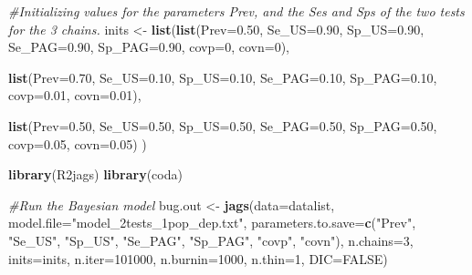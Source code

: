 \documentclass[
]{book}
\newenvironment{Shaded}{\begin{snugshade}}{\end{snugshade}}
\newcommand{\AttributeTok}[1]{\textcolor[rgb]{0.13,0.29,0.53}{#1}}
\newcommand{\CommentTok}[1]{\textcolor[rgb]{0.56,0.35,0.01}{\textit{#1}}}
\newcommand{\ConstantTok}[1]{\textcolor[rgb]{0.56,0.35,0.01}{#1}}
\newcommand{\DecValTok}[1]{\textcolor[rgb]{0.00,0.00,0.81}{#1}}
\newcommand{\FloatTok}[1]{\textcolor[rgb]{0.00,0.00,0.81}{#1}}
\newcommand{\FunctionTok}[1]{\textcolor[rgb]{0.13,0.29,0.53}{\textbf{#1}}}
\newcommand{\NormalTok}[1]{#1}
\newcommand{\OtherTok}[1]{\textcolor[rgb]{0.56,0.35,0.01}{#1}}
\newcommand{\StringTok}[1]{\textcolor[rgb]{0.31,0.60,0.02}{#1}}
\begin{document}
\begin{Shaded}
\begin{Highlighting}[]
\CommentTok{\#Initializing values for the parameters Prev, and the Ses and Sps of the two tests for the 3 chains.}
\NormalTok{inits }\OtherTok{\textless{}{-}} \FunctionTok{list}\NormalTok{(}\FunctionTok{list}\NormalTok{(}\AttributeTok{Prev=}\FloatTok{0.50}\NormalTok{,}
              \AttributeTok{Se\_US=}\FloatTok{0.90}\NormalTok{,}
              \AttributeTok{Sp\_US=}\FloatTok{0.90}\NormalTok{,}
              \AttributeTok{Se\_PAG=}\FloatTok{0.90}\NormalTok{,}
              \AttributeTok{Sp\_PAG=}\FloatTok{0.90}\NormalTok{,}
              \AttributeTok{covp=}\DecValTok{0}\NormalTok{,}
              \AttributeTok{covn=}\DecValTok{0}\NormalTok{),}
              
              \FunctionTok{list}\NormalTok{(}\AttributeTok{Prev=}\FloatTok{0.70}\NormalTok{,}
              \AttributeTok{Se\_US=}\FloatTok{0.10}\NormalTok{,}
              \AttributeTok{Sp\_US=}\FloatTok{0.10}\NormalTok{,}
              \AttributeTok{Se\_PAG=}\FloatTok{0.10}\NormalTok{,}
              \AttributeTok{Sp\_PAG=}\FloatTok{0.10}\NormalTok{,}
              \AttributeTok{covp=}\FloatTok{0.01}\NormalTok{,}
              \AttributeTok{covn=}\FloatTok{0.01}\NormalTok{),}
              
              \FunctionTok{list}\NormalTok{(}\AttributeTok{Prev=}\FloatTok{0.50}\NormalTok{,}
              \AttributeTok{Se\_US=}\FloatTok{0.50}\NormalTok{,}
              \AttributeTok{Sp\_US=}\FloatTok{0.50}\NormalTok{,}
              \AttributeTok{Se\_PAG=}\FloatTok{0.50}\NormalTok{,}
              \AttributeTok{Sp\_PAG=}\FloatTok{0.50}\NormalTok{,}
              \AttributeTok{covp=}\FloatTok{0.05}\NormalTok{,}
              \AttributeTok{covn=}\FloatTok{0.05}\NormalTok{)}
\NormalTok{              )}


\FunctionTok{library}\NormalTok{(R2jags)}
\FunctionTok{library}\NormalTok{(coda)}

\CommentTok{\#Run the Bayesian model}
\NormalTok{bug.out }\OtherTok{\textless{}{-}} \FunctionTok{jags}\NormalTok{(}\AttributeTok{data=}\NormalTok{datalist,                             }
               \AttributeTok{model.file=}\StringTok{"model\_2tests\_1pop\_dep.txt"}\NormalTok{,     }
               \AttributeTok{parameters.to.save=}\FunctionTok{c}\NormalTok{(}\StringTok{"Prev"}\NormalTok{, }\StringTok{"Se\_US"}\NormalTok{, }\StringTok{"Sp\_US"}\NormalTok{, }\StringTok{"Se\_PAG"}\NormalTok{, }\StringTok{"Sp\_PAG"}\NormalTok{, }\StringTok{"covp"}\NormalTok{, }\StringTok{"covn"}\NormalTok{),               }
               \AttributeTok{n.chains=}\DecValTok{3}\NormalTok{,                                 }
               \AttributeTok{inits=}\NormalTok{inits,                                }
               \AttributeTok{n.iter=}\DecValTok{101000}\NormalTok{,                                }
               \AttributeTok{n.burnin=}\DecValTok{1000}\NormalTok{,                              }
               \AttributeTok{n.thin=}\DecValTok{1}\NormalTok{,                                   }
               \AttributeTok{DIC=}\ConstantTok{FALSE}\NormalTok{)                                   }
\end{Highlighting}
\end{Shaded}
\end{document}
